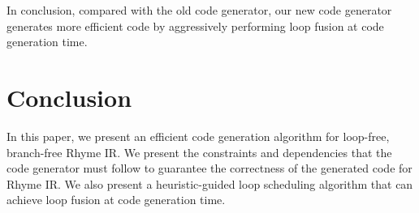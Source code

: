 \documentclass[sigplan, nonacm]{acmart}\settopmatter{printfolios=true,printccs=false,printacmref=false}
\begin{document}
In conclusion, compared with the old code generator, our new code generator generates more efficient code by aggressively performing loop fusion at code generation time.

\section{Conclusion}\label{conclusion}

In this paper, we present an efficient code generation algorithm for loop-free, branch-free Rhyme IR. We present the constraints and dependencies that the code generator must follow to guarantee the correctness of the generated code for Rhyme IR. We also present a heuristic-guided loop scheduling algorithm that can achieve loop fusion at code generation time.


\end{document}
